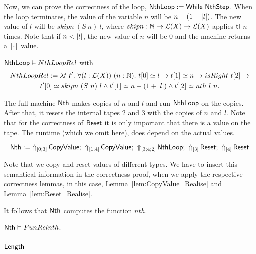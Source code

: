 Now, we can prove the correctness of the loop, $\MS{NthLoop} := \While~\MS{NthStep}$.  When the loop terminates, the value of the variable $n$ will be
$n - (1 + \length{l})$.  The new value of $l$ will be $skipn~(S~n)~l$, where $skipn : \Nat \to \List(X) \to \List(X)$ applies $\tl$ $n$-times.  Note
that if $n < \length{l}$, the new value of $n$ will be $0$ and the machine returns a $\Some\cdot$ value.

\begin{lemma}
  \label{lem:Nth_Loop_Realise}
  $\MS{NthLoop} \Realise NthLoopRel$ with
  \begin{multline*}
    NthLoopRel :=
    \lambda t~t'.~\forall (l:\List(X))~(n:\Nat).~t[0] \simeq l \rightarrow t[1] \simeq n \rightarrow isRight~t[2] \rightarrow \\
    t'[0] \simeq skipn~(S~n)~l \land t'[1] \simeq n-(1+\length{l}) \land t'[2] \simeq nth~l~n.
  \end{multline*}
\end{lemma}

The full machine $\MS{Nth}$ makes copies of $n$ and $l$ and run $\MS{NthLoop}$ on the copies.  After that, it resets the internal tapes $2$ and $3$
with the copies of $n$ and $l$.  Note that for the correctness of $\MS{Reset}$ it is only important that there is a value on the tape.  The runtime
(which we omit here), does depend on the actual values.
\begin{definition}[$\MS{Nth}$]
  \[
    \MS{Nth} := \LiftTapes{\MS{CopyValue}}{\Vector{0;3}} \Seq
    \LiftTapes{\MS{CopyValue}}{\Vector{1;4}} \Seq
    \LiftTapes{\MS{NthLoop}}{\Vector{3;4;2}} \Seq
    \LiftTapes{\MS{Reset}}{\Vector{3}} \Seq
    \LiftTapes{\MS{Reset}}{\Vector{4}}
  \]
\end{definition}
Note that we copy and reset values of different types.  We have to insert this semantical information in the correctness proof, when we apply the
respective correctness lemmas, in this case, Lemma~\ref{lem:CopyValue_Realise} and Lemma~\ref{lem:Reset_Realise}.

It follows that $\MS{Nth}$ computes the function $nth$.
\begin{lemma}
  \label{lem:Nth_Computes}
  $\MS{Nth} \Realise FunRel nth$.
\end{lemma}


\subsubsection{$\MS{Length}$}
\label{sec:Length}



